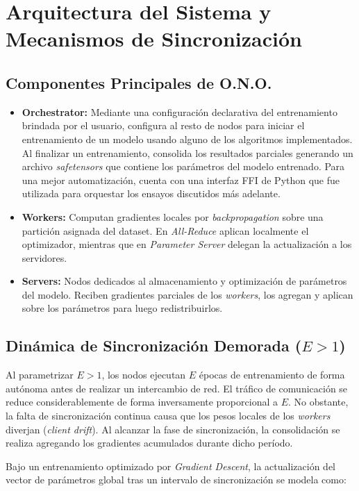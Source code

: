 
\section{Arquitectura del Sistema y Mecanismos de Sincronización}

\subsection{Componentes Principales de O.N.O.}
\begin{itemize}
    \item \textbf{Orchestrator:} Mediante una configuración declarativa del entrenamiento brindada por el usuario, configura al resto de nodos para iniciar el entrenamiento de un modelo usando alguno de los algoritmos implementados. Al finalizar un entrenamiento, consolida los resultados parciales generando un archivo \emph{safetensors} que contiene los parámetros del modelo entrenado. Para una mejor automatización, cuenta con una interfaz FFI de Python que fue utilizada para orquestar los ensayos discutidos más adelante.
    \item \textbf{Workers:} Computan gradientes locales por \emph{backpropagation} sobre una partición asignada del dataset. En \emph{All-Reduce} aplican localmente el optimizador, mientras que en \emph{Parameter Server} delegan la actualización a los servidores.
    \item \textbf{Servers:} Nodos dedicados al almacenamiento y optimización de parámetros del modelo. Reciben gradientes parciales de los \emph{workers}, los agregan y aplican sobre los parámetros para luego redistribuirlos.
\end{itemize}

\subsection{Dinámica de Sincronización Demorada ($E > 1$)}
Al parametrizar $E > 1$, los nodos ejecutan $E$ épocas de entrenamiento de forma autónoma antes de realizar un intercambio de red. El tráfico de comunicación se reduce considerablemente de forma inversamente proporcional a $E$. No obstante, la falta de sincronización continua causa que los pesos locales de los \emph{workers} diverjan (\emph{client drift}). Al alcanzar la fase de sincronización, la consolidación se realiza agregando los gradientes acumulados durante dicho período.

Bajo un entrenamiento optimizado por \emph{Gradient Descent}, la actualización del vector de parámetros global tras un intervalo de sincronización se modela como:

